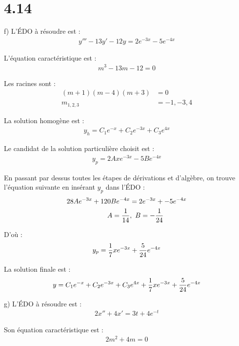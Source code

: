 \section*{4.14}

f) L'ÉDO à résoudre est :
\begin{align*}
    y''' - 13y' - 12y = 2e^{-3x} - 5e^{-4x}
\end{align*}

L'équation caractéristique est :
\begin{align*}
    m^3 - 13m -12 = 0
\end{align*}

Les racines sont :
\begin{align*}
    (m+1)(m-4)(m+3) &= 0 \\
    m_{1,2,3} &= -1,-3,4
\end{align*}

La solution homogène est :
\begin{align*}
    y_h = C_1e^{-x}+C_2e^{-3x}+C_3e^{4x}
\end{align*}

Le candidat de la solution particulière choisit est :
\begin{align*}
    y_p = 2Axe^{-3x} - 5Be^{-4x}
\end{align*}

En passant par dessus toutes les étapes de dérivations et d'algèbre, on trouve
l'équation suivante en insérant $y_p$ dans l'ÉDO :
\begin{align*}
    28Ae^{-3x} +120Be^{-4x} &= 2e^{-3x} +-5e^{-4x} \\
    A = \dfrac{1}{14}&,\ B = -\dfrac{1}{24}
\end{align*}

D'où :
\begin{align*}
    y_p = \dfrac{1}{7}xe^{-3x} + \dfrac{5}{24}e^{-4x}
\end{align*}

La solution finale est :
\begin{align*}
    y = C_1 e^{-x} + C_2 e^{-3x} + C_3 e^{4x} +\dfrac{1}{7}xe^{-3x} + \dfrac{5}{24}e^{-4x}
\end{align*}

g) L'ÉDO à résoudre est :
\begin{align*}
    2x'' +4x' = 3t + 4e^{-t}
\end{align*}

Son équation caractéristique est :
\begin{align*}
    2m^2 + 4m = 0
\end{align*}

